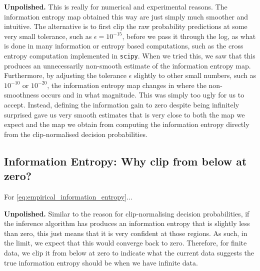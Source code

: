 \documentclass{article}
\newcommand{\note}[1]{{\color{orange} #1}}
\begin{document}
		\note{\textbf{Unpolished.}} This is really for numerical and experimental reasons. The information entropy map obtained this way are just simply much smoother and intuitive. The alternative is to first clip the raw probability predictions at some very small tolerance, such as $\epsilon = 10^{-15}$, before we pass it through the log, as what is done in many information or entropy based computations, such as the cross entropy computation implemented in \texttt{scipy}. When we tried this, we saw that this produces an unnecessarily non-smooth estimate of the information entropy map. Furthermore, by adjusting the tolerance $\epsilon$ slightly to other small numbers, such as $10^{-10}$ or $10^{-20}$, the information entropy map changes in where the non-smoothness occurs and in what magnitude. This was simply too ugly for us to accept. Instead, defining the information gain to zero despite being infinitely surprised gave us very smooth estimates that is very close to both the map we expect and the map we obtain from computing the information entropy directly from the clip-normalised decision probabilities.
		
	\subsection{Information Entropy: Why clip from below at zero?}
	
		For \eqref{eq:empirical_information_entropy}...
		
		\note{\textbf{Unpolished.}} Similar to the reason for clip-normalising decision probabilities, if the inference algorithm has produces an information entropy that is slightly less than zero, this just means that it is very confident at those regions. As such, in the limit, we expect that this would converge back to zero. Therefore, for finite data, we clip it from below at zero to indicate what the current data suggests the true information entropy should be when we have infinite data.
		
\end{document}

